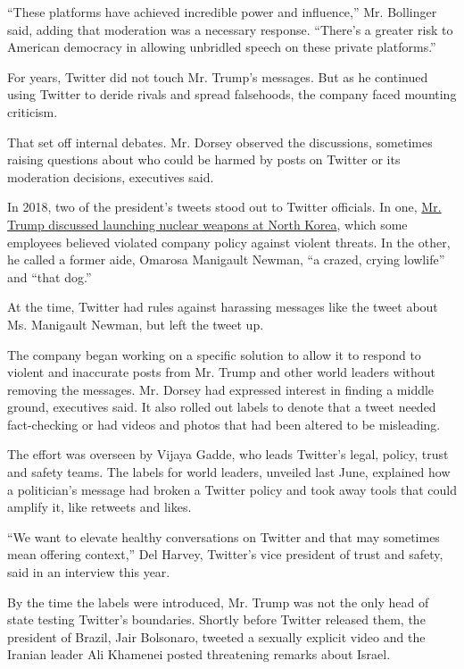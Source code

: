 ``These platforms have achieved incredible power and influence,'' Mr.
Bollinger said, adding that moderation was a necessary response.
``There's a greater risk to American democracy in allowing unbridled
speech on these private platforms.''

For years, Twitter did not touch Mr. Trump's messages. But as he
continued using Twitter to deride rivals and spread falsehoods, the
company faced mounting criticism.

That set off internal debates. Mr. Dorsey observed the discussions,
sometimes raising questions about who could be harmed by posts on
Twitter or its moderation decisions, executives said.

In 2018, two of the president's tweets stood out to Twitter officials.
In one,
\href{https://twitter.com/realdonaldtrump/status/948355557022420992?lang=en}{Mr.
Trump discussed launching nuclear weapons at North Korea}, which some
employees believed violated company policy against violent threats. In
the other, he called a former aide, Omarosa Manigault Newman, ``a
crazed, crying lowlife'' and ``that dog.''

At the time, Twitter had rules against harassing messages like the tweet
about Ms. Manigault Newman, but left the tweet up.

The company began working on a specific solution to allow it to respond
to violent and inaccurate posts from Mr. Trump and other world leaders
without removing the messages. Mr. Dorsey had expressed interest in
finding a middle ground, executives said. It also rolled out labels to
denote that a tweet needed fact-checking or had videos and photos that
had been altered to be misleading.

The effort was overseen by Vijaya Gadde, who leads Twitter's legal,
policy, trust and safety teams. The labels for world leaders, unveiled
last June, explained how a politician's message had broken a Twitter
policy and took away tools that could amplify it, like retweets and
likes.

``We want to elevate healthy conversations on Twitter and that may
sometimes mean offering context,'' Del Harvey, Twitter's vice president
of trust and safety, said in an interview this year.

By the time the labels were introduced, Mr. Trump was not the only head
of state testing Twitter's boundaries. Shortly before Twitter released
them, the president of Brazil, Jair Bolsonaro, tweeted a sexually
explicit video and the Iranian leader Ali Khamenei posted threatening
remarks about Israel.

